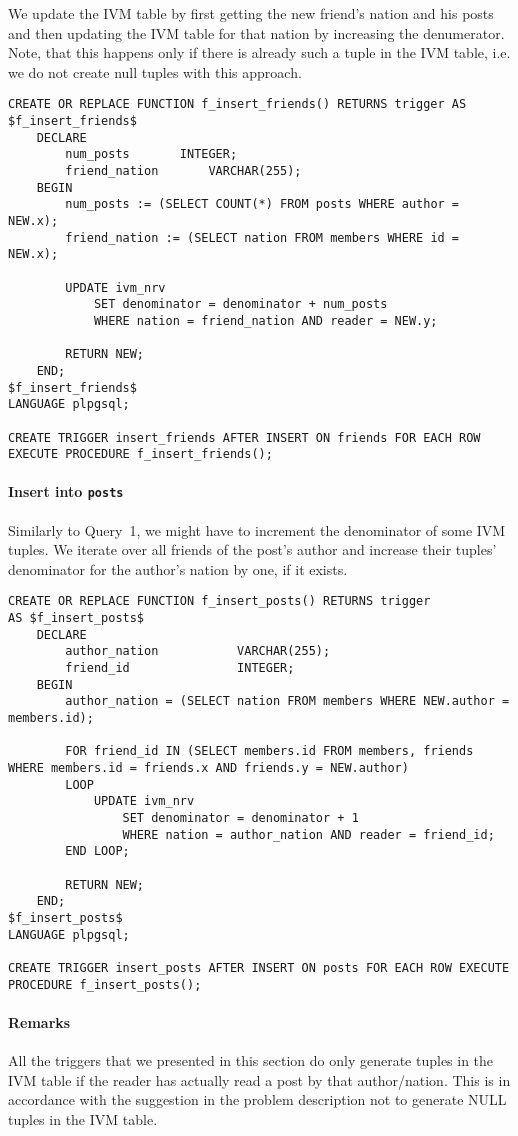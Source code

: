 \documentclass[12pt]{article}
\begin{document}
We update the IVM table by first getting the new friend's nation and his posts and then updating the IVM table for that nation by increasing the denumerator. Note, that this happens only if there is already such a tuple in the IVM table, i.e. we do not create null tuples with this approach.
\begin{lstlisting}
CREATE OR REPLACE FUNCTION f_insert_friends() RETURNS trigger AS
$f_insert_friends$
	DECLARE
		num_posts 		INTEGER;
		friend_nation 		VARCHAR(255);
	BEGIN
		num_posts := (SELECT COUNT(*) FROM posts WHERE author = NEW.x);
		friend_nation := (SELECT nation FROM members WHERE id = NEW.x);

		UPDATE ivm_nrv
			SET denominator = denominator + num_posts
			WHERE nation = friend_nation AND reader = NEW.y;

		RETURN NEW;
	END;
$f_insert_friends$
LANGUAGE plpgsql;

CREATE TRIGGER insert_friends AFTER INSERT ON friends FOR EACH ROW EXECUTE PROCEDURE f_insert_friends();
\end{lstlisting}

\paragraph{Insert into \lstinline{posts}}
Similarly to Query~1, we might have to increment the denominator of some IVM tuples. We iterate over all friends of the post's author and increase their tuples' denominator for the author's nation by one, if it exists.
\begin{lstlisting}
CREATE OR REPLACE FUNCTION f_insert_posts() RETURNS trigger
AS $f_insert_posts$
	DECLARE
		author_nation			VARCHAR(255);
		friend_id				INTEGER;
	BEGIN
		author_nation = (SELECT nation FROM members WHERE NEW.author = members.id);

		FOR friend_id IN (SELECT members.id FROM members, friends WHERE members.id = friends.x AND friends.y = NEW.author)
		LOOP
			UPDATE ivm_nrv
				SET denominator = denominator + 1
				WHERE nation = author_nation AND reader = friend_id;
		END LOOP;

		RETURN NEW;
	END;
$f_insert_posts$
LANGUAGE plpgsql;

CREATE TRIGGER insert_posts AFTER INSERT ON posts FOR EACH ROW EXECUTE PROCEDURE f_insert_posts();
\end{lstlisting}

\paragraph{Remarks}
All the triggers that we presented in this section do only generate tuples in the IVM table if the reader has actually read a post by that author/nation. This is in accordance with the suggestion in the problem description not to generate NULL tuples in the IVM table.
\end{document}
